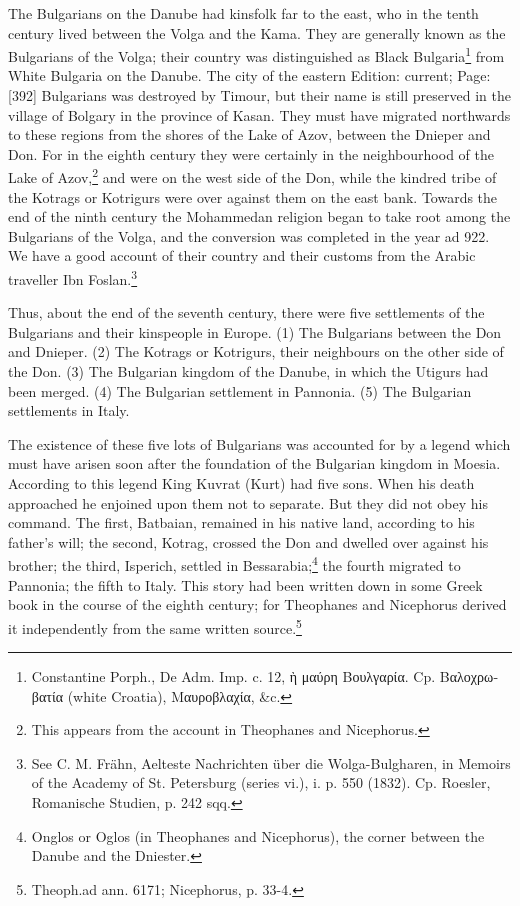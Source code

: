 The Bulgarians on the Danube had kinsfolk far to the east, who in the tenth century lived between the Volga and the Kama. They are generally known as the Bulgarians of the Volga; their country was distinguished as Black Bulgaria\footnote{Constantine Porph., De Adm. Imp. c. 12, \textgreek{\texthebrew{ὴ} μαύρη Βουλγαρία}. Cp. \textgreek{Βαλοχρωβατία} (white Croatia), \textgreek{Μαυροβλαχία}, \&c.} from White Bulgaria on the Danube. The city of the eastern Edition: current; Page: [392] Bulgarians was destroyed by Timour, but their name is still preserved in the village of Bolgary in the province of Kasan. They must have migrated northwards to these regions from the shores of the Lake of Azov, between the Dnieper and Don. For in the eighth century they were certainly in the neighbourhood of the Lake of Azov,\footnote{This appears from the account in Theophanes and Nicephorus.} and were on the west side of the Don, while the kindred tribe of the Kotrags or Kotrigurs were over against them on the east bank. Towards the end of the ninth century the Mohammedan religion began to take root among the Bulgarians of the Volga, and the conversion was completed in the year ad 922. We have a good account of their country and their customs from the Arabic traveller Ibn Foslan.\footnote{See C. M. Frähn, Aelteste Nachrichten über die Wolga-Bulgharen, in Memoirs of the Academy of St. Petersburg (series vi.), i. p. 550 (1832). Cp. Roesler, Romanische Studien, p. 242 sqq.}

Thus, about the end of the seventh century, there were five settlements of the Bulgarians and their kinspeople in Europe. (1) The Bulgarians between the Don and Dnieper. (2) The Kotrags or Kotrigurs, their neighbours on the other side of the Don. (3) The Bulgarian kingdom of the Danube, in which the Utigurs had been merged. (4) The Bulgarian settlement in Pannonia. (5) The Bulgarian settlements in Italy.

The existence of these five lots of Bulgarians was accounted for by a legend which must have arisen soon after the foundation of the Bulgarian kingdom in Moesia. According to this legend King Kuvrat (Kurt) had five sons. When his death approached he enjoined upon them not to separate. But they did not obey his command. The first, Batbaian, remained in his native land, according to his father\texthebrew{}’s will; the second, Kotrag, crossed the Don and dwelled over against his brother; the third, Isperich, settled in Bessarabia;\footnote{Onglos or Oglos (in Theophanes and Nicephorus), the corner between the Danube and the Dniester.} the fourth migrated to Pannonia; the fifth to Italy. This story had been written down in some Greek book in the course of the eighth century; for Theophanes and Nicephorus derived it independently from the same written source.\footnote{Theoph.ad ann. 6171; Nicephorus, p. 33-4.}

